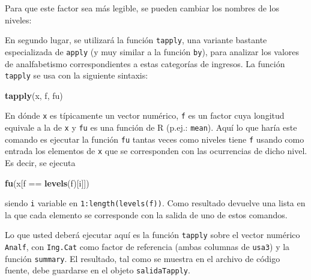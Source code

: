 \documentclass[]{article}
\newenvironment{Shaded}{}{}
\newcommand{\KeywordTok}[1]{\textcolor[rgb]{0.00,0.44,0.13}{\textbf{{#1}}}}
\newcommand{\DecValTok}[1]{\textcolor[rgb]{0.25,0.63,0.44}{{#1}}}
\newcommand{\StringTok}[1]{\textcolor[rgb]{0.25,0.44,0.63}{{#1}}}
\newcommand{\NormalTok}[1]{{#1}}
\begin{document}
\begin{Shaded}
\end{Shaded}
Para que este factor sea más legible, se pueden cambiar los nombres de
los niveles:

\begin{Shaded}
\end{Shaded}
En segundo lugar, se utilizará la función \texttt{tapply}, una variante
bastante especializada de \texttt{apply} (y muy similar a la función
\texttt{by}), para analizar los valores de analfabetismo
correspondientes a estas categorías de ingresos. La función
\texttt{tapply} se usa con la siguiente sintaxis:

\begin{Shaded}
\begin{Highlighting}[]
\KeywordTok{tapply}\NormalTok{(x, f, fu)}
\end{Highlighting}
\end{Shaded}
En dónde \texttt{x} es típicamente un vector numérico, \texttt{f} es un
factor cuya longitud equivale a la de \texttt{x} y \texttt{fu} es una
función de R (p.ej.: \texttt{mean}). Aquí lo que haría este comando es
ejecutar la función \texttt{fu} tantas veces como niveles tiene
\texttt{f} usando como entrada los elementos de \texttt{x} que se
corresponden con las ocurrencias de dicho nivel. Es decir, se ejecuta

\begin{Shaded}
\begin{Highlighting}[]
\KeywordTok{fu}\NormalTok{(x[f == }\KeywordTok{levels}\NormalTok{(f)[i]])}
\end{Highlighting}
\end{Shaded}
siendo \texttt{i} variable en \texttt{1:length(levels(f))}. Como
resultado devuelve una lista en la que cada elemento se corresponde con
la salida de uno de estos comandos.

Lo que usted deberá ejecutar aquí es la función \texttt{tapply} sobre el
vector numérico \texttt{Analf}, con \texttt{Ing.Cat} como factor de
referencia (ambas columnas de \texttt{usa3}) y la función
\texttt{summary}. El resultado, tal como se muestra en el archivo de
código fuente, debe guardarse en el objeto \texttt{salidaTapply}.
\end{document}
